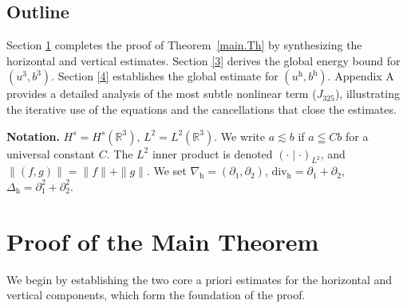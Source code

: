\documentclass[11pt]{amsart}
\theoremstyle{definition}
\numberwithin{equation}{section}
\begin{document}
\subsection*{Outline}
{Section \ref{2}} completes the proof of Theorem~\ref{main.Th} by synthesizing the horizontal and vertical estimates.
{Section \ref{3}} derives the global energy bound for $(u^3,b^3)$.
{Section \ref{4}} establishes the global estimate for $(u^\mathrm{h},b^\mathrm{h})$.
{Appendix A} provides a detailed analysis of the most subtle nonlinear term ($J_{325}$), illustrating the iterative use of the equations and the cancellations that close the estimates.


\noindent\textbf{Notation.} $H^s=H^s(\mathbb{R}^3)$, $L^2=L^2(\mathbb{R}^3)$. We write $a\lesssim b$ if $a\leqq Cb$ for a universal constant $C$. The $L^2$ inner product is denoted $(\cdot\mid\cdot)_{L^2}$, and $\|(f,g)\|=\|f\|+\|g\|$. We set $\nabla_\mathrm{h}=(\partial_1,\partial_2)$, $\mathrm{div}_\mathrm{h}=\partial_1+\partial_2$, $\Delta_\mathrm{h}=\partial_1^2+\partial_2^2$.

\section{Proof of the Main Theorem}\label{2}

We begin by establishing the two core a priori estimates for the horizontal and vertical components, which form the foundation of the proof.
\end{document}
